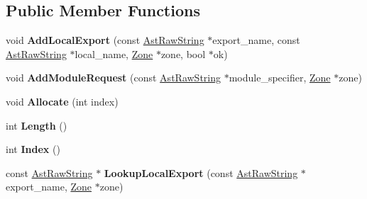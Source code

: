 \subsection*{Public Member Functions}
\begin{DoxyCompactItemize}
\item 
void {\bfseries Add\+Local\+Export} (const \hyperlink{classv8_1_1internal_1_1_ast_raw_string}{Ast\+Raw\+String} $\ast$export\+\_\+name, const \hyperlink{classv8_1_1internal_1_1_ast_raw_string}{Ast\+Raw\+String} $\ast$local\+\_\+name, \hyperlink{classv8_1_1internal_1_1_zone}{Zone} $\ast$zone, bool $\ast$ok)\hypertarget{classv8_1_1internal_1_1_module_descriptor_aad6c6b06bb15be206017e18e78ebbbf1}{}\label{classv8_1_1internal_1_1_module_descriptor_aad6c6b06bb15be206017e18e78ebbbf1}

\item 
void {\bfseries Add\+Module\+Request} (const \hyperlink{classv8_1_1internal_1_1_ast_raw_string}{Ast\+Raw\+String} $\ast$module\+\_\+specifier, \hyperlink{classv8_1_1internal_1_1_zone}{Zone} $\ast$zone)\hypertarget{classv8_1_1internal_1_1_module_descriptor_aa015c0f6f74f8e6be1f5adeecc304c89}{}\label{classv8_1_1internal_1_1_module_descriptor_aa015c0f6f74f8e6be1f5adeecc304c89}

\item 
void {\bfseries Allocate} (int index)\hypertarget{classv8_1_1internal_1_1_module_descriptor_ac714a49c507994ce5871f975ed6fb8ea}{}\label{classv8_1_1internal_1_1_module_descriptor_ac714a49c507994ce5871f975ed6fb8ea}

\item 
int {\bfseries Length} ()\hypertarget{classv8_1_1internal_1_1_module_descriptor_ac73e118dfba6d0788bc7d9c315063f3a}{}\label{classv8_1_1internal_1_1_module_descriptor_ac73e118dfba6d0788bc7d9c315063f3a}

\item 
int {\bfseries Index} ()\hypertarget{classv8_1_1internal_1_1_module_descriptor_ae51b85fb9a99ebe4c3752bca9ec99d17}{}\label{classv8_1_1internal_1_1_module_descriptor_ae51b85fb9a99ebe4c3752bca9ec99d17}

\item 
const \hyperlink{classv8_1_1internal_1_1_ast_raw_string}{Ast\+Raw\+String} $\ast$ {\bfseries Lookup\+Local\+Export} (const \hyperlink{classv8_1_1internal_1_1_ast_raw_string}{Ast\+Raw\+String} $\ast$export\+\_\+name, \hyperlink{classv8_1_1internal_1_1_zone}{Zone} $\ast$zone)\hypertarget{classv8_1_1internal_1_1_module_descriptor_a00dd94378ba1a6a763e5ff6be30126e2}{}\label{classv8_1_1internal_1_1_module_descriptor_a00dd94378ba1a6a763e5ff6be30126e2}


\end{DoxyCompactItemize}
